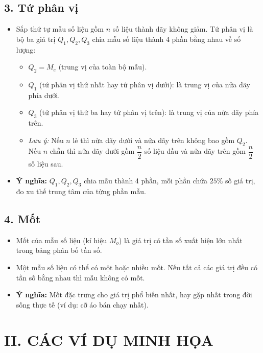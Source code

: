 \subsection*{3. Tứ phân vị}
\begin{itemize}
	\item Sắp thứ tự mẫu số liệu gồm $n$ số liệu thành dãy không giảm. Tứ phân vị là bộ ba giá trị $Q_1, Q_2, Q_3$ chia mẫu số liệu thành 4 phần bằng nhau về số lượng:
	\begin{itemize}
		\item $Q_2 = M_e$ (trung vị của toàn bộ mẫu).
		\item $Q_1$ (tứ phân vị thứ nhất hay tứ phân vị dưới): là trung vị của nửa dãy phía dưới.
		\item $Q_3$ (tứ phân vị thứ ba hay tứ phân vị trên): là trung vị của nửa dãy phía trên.
		\item \textit{Lưu ý:} Nếu $n$ lẻ thì nửa dãy dưới và nửa dãy trên không bao gồm $Q_2$. Nếu $n$ chẵn thì nửa dãy dưới gồm $\dfrac{n}{2}$ số liệu đầu và nửa dãy trên gồm $\dfrac{n}{2}$ số liệu sau.
	\end{itemize}
	\item \textbf{Ý nghĩa:} $Q_1, Q_2, Q_3$ chia mẫu thành 4 phần, mỗi phần chứa $25\%$ số giá trị, đo xu thế trung tâm của từng phần mẫu.
\end{itemize}

\subsection*{4. Mốt}
\begin{itemize}
	\item Mốt của mẫu số liệu (kí hiệu $M_o$) là giá trị có tần số xuất hiện lớn nhất trong bảng phân bố tần số.
	\item Một mẫu số liệu có thể có một hoặc nhiều mốt. Nếu tất cả các giá trị đều có tần số bằng nhau thì mẫu không có mốt.
	\item \textbf{Ý nghĩa:} Mốt đặc trưng cho giá trị phổ biến nhất, hay gặp nhất trong đời sống thực tế (ví dụ: cỡ áo bán chạy nhất).
\end{itemize}

\vspace{0.3cm}
\section*{II. CÁC VÍ DỤ MINH HỌA}

